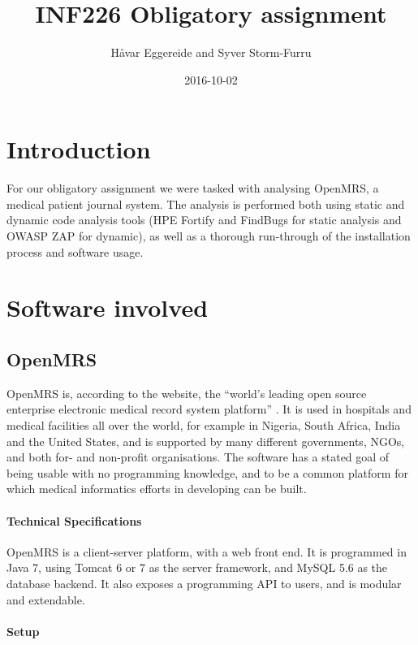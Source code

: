 \documentclass{article}
\title{INF226 Obligatory assignment}
\date{2016-10-02}
\author{Håvar Eggereide and Syver Storm-Furru}
\begin{document}
\maketitle
{}
\newpage
{}
\tableofcontents
\newpage
\section{Introduction}

  For our obligatory assignment we were tasked with analysing OpenMRS, a medical
  patient journal system. The analysis is performed both using static and
  dynamic code analysis tools (HPE Fortify and FindBugs for static analysis and
  OWASP ZAP for dynamic), as well as a thorough run-through of the installation
  process and software usage.

\newpage
\section{Software involved}
  
\subsection{OpenMRS}

  OpenMRS is, according to the website, the ``world's leading open source
  enterprise electronic medical record system platform'' \autocite[]{OpenMRSAbout}. It is used in
  hospitals and medical facilities all over the world, for example in Nigeria, South Africa, India
  and the United States, and is supported by many different governments, NGOs,
  and both for- and non-profit organisations. The software has a stated goal of
  being usable with no programming knowledge, and to be a common platform for
  which medical informatics efforts in developing can be built.

  \paragraph{Technical Specifications}

  OpenMRS is a client-server platform, with a web front end. It is programmed in
  Java 7, using Tomcat 6 or 7 as the server framework, and MySQL 5.6 as the
  database backend. It also exposes a programming API to users, and is modular
  and extendable.

  \paragraph{Setup}
\end{document}
